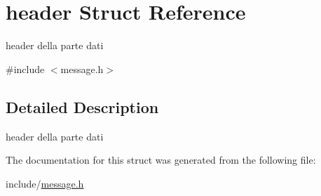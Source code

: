\hypertarget{structheader}{}\section{header Struct Reference}
\label{structheader}


header della parte dati  




{\ttfamily \#include $<$message.\+h$>$}



\subsection{Detailed Description}
header della parte dati 

The documentation for this struct was generated from the following file\+:\begin{DoxyCompactItemize}
\item 
include/\hyperlink{message_8h}{message.\+h}\end{DoxyCompactItemize}

